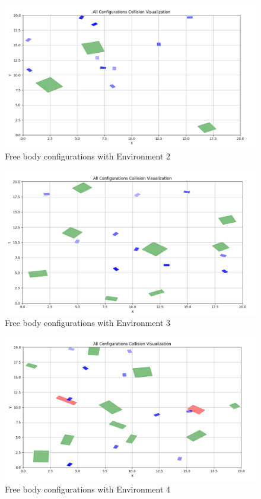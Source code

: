 \documentclass{article}
\begin{document}
\begin{figure} [H]
    \centering
    \includegraphics[width=0.7\linewidth]{latex_media/config_collision_freebody_env2.png}
    \caption{Free body configurations with Environment 2}
\end{figure}

\begin{figure} [H]
    \centering
    \includegraphics[width=0.7\linewidth]{latex_media/config_collision_freebody_env3.png}
    \caption{Free body configurations with Environment 3}
\end{figure}

\begin{figure} [H]
    \centering
    \includegraphics[width=0.7\linewidth]{latex_media/config_collision_freebody_env4.png}
    \caption{Free body configurations with Environment 4}
\end{figure}
\end{document}
